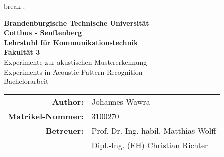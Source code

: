 

\pagestyle{empty} %

\newtheoremstyle
{break}     %
{}{}        %
{}  %
{}          %
{\bfseries} %
{.}         %
{\newline}  %
{}          %

\newtheorem{numm}{Definition}[chapter]
\theoremstyle{break}
\newtheorem{bsp}[numm]{Beispiel}
\newtheorem{ein}[numm]{Eingabe}


\clearscrheadings\clearscrplain
\begin{center}
\textbf{Brandenburgische Technische Universität \\ Cottbus - Senftenberg\\ 
\vspace{5mm}
Lehrstuhl für Kommunikationstechnik  \\ Fakultät 3}\\



\vspace{6cm}
{\LARGE Experimente zur akustischen Mustererkennung} \\
\vspace{3mm}
{\large Experiments in Acoustic Pattern Recognition} \\
\vspace{3 cm}
{\Large Bachelorarbeit}\\

\vspace{5cm}
\begin{tabular}{rl}
{\bfseries Author:}& Johannes Wawra \\
{\bfseries Matrikel-Nummer:}& 3100270 \\
{\bfseries Betreuer:} & Prof. Dr.-Ing. habil. Matthias Wolff \\
& Dipl.-Ing. (FH) Christian Richter \\
\end{tabular}

\end{center}

\clearpage


\pagestyle{useheadings} %

